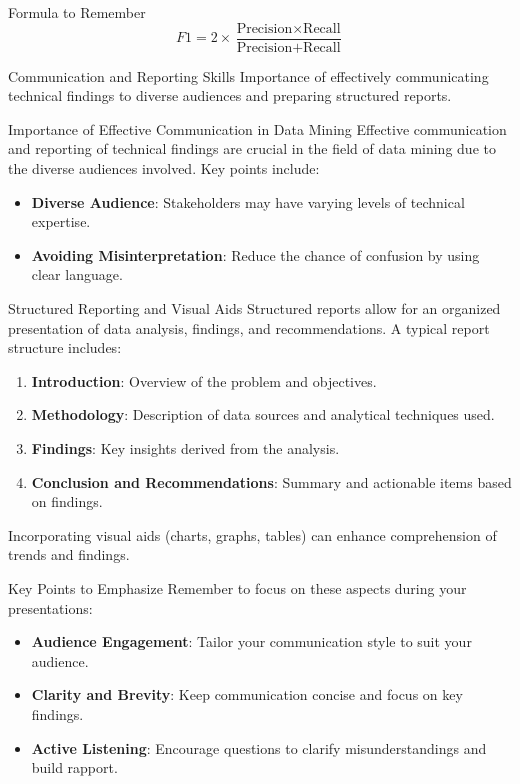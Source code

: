 \documentclass[aspectratio=169]{beamer}
\begin{document}
\begin{frame}{Formula to Remember}
    \begin{equation}
        F1 = 2 \times \frac{\text{Precision} \times \text{Recall}}{\text{Precision} + \text{Recall}}
    \end{equation}
\end{frame}

\begin{frame}[fragile]{Communication and Reporting Skills}
    Importance of effectively communicating technical findings to diverse audiences and preparing structured reports.
\end{frame}

\begin{frame}[fragile]{Importance of Effective Communication in Data Mining}
    Effective communication and reporting of technical findings are crucial in the field of data mining due to the diverse audiences involved. Key points include:
    \begin{itemize}
        \item \textbf{Diverse Audience}: Stakeholders may have varying levels of technical expertise.
        \item \textbf{Avoiding Misinterpretation}: Reduce the chance of confusion by using clear language.
    \end{itemize}
\end{frame}

\begin{frame}[fragile]{Structured Reporting and Visual Aids}
    Structured reports allow for an organized presentation of data analysis, findings, and recommendations. A typical report structure includes:
    \begin{enumerate}
        \item \textbf{Introduction}: Overview of the problem and objectives.
        \item \textbf{Methodology}: Description of data sources and analytical techniques used.
        \item \textbf{Findings}: Key insights derived from the analysis.
        \item \textbf{Conclusion and Recommendations}: Summary and actionable items based on findings.
    \end{enumerate}
    Incorporating visual aids (charts, graphs, tables) can enhance comprehension of trends and findings. 
\end{frame}

\begin{frame}[fragile]{Key Points to Emphasize}
    Remember to focus on these aspects during your presentations:
    \begin{itemize}
        \item \textbf{Audience Engagement}: Tailor your communication style to suit your audience.
        \item \textbf{Clarity and Brevity}: Keep communication concise and focus on key findings.
        \item \textbf{Active Listening}: Encourage questions to clarify misunderstandings and build rapport.
    \end{itemize}
\end{frame}
\end{document}
